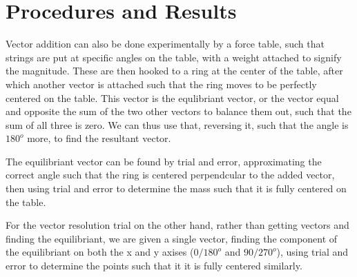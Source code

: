 \documentclass[11pt, titlepage]{article}
\begin{document}
\section*{Procedures and Results}
Vector addition can also be done experimentally by a force table, such that strings are put at specific angles on the table, with a weight attached to signify the magnitude. These are then hooked to a ring at the center of the table, after which another vector is attached such that the ring moves to be perfectly centered on the table. This vector is the equlibriant vector, or the vector equal and opposite the sum of the two other vectors to balance them out, such that the sum of all three is zero. We can thus use that, reversing it, such that the angle is $180^o$ more, to find the resultant vector.

The equilibriant vector can be found by trial and error, approximating the correct angle such that the ring is centered perpendcular to the added vector, then using trial and error to determine the mass such that it is fully centered on the table.

For the vector resolution trial on the other hand, rather than getting vectors and finding the equilibriant, we are given a single vector, finding the component of the equilibriant on both the x and y axises ($0/180^o$ and $90/270^o$), using trial and error to determine the points such that it it is fully centered similarly.
\end{document}
